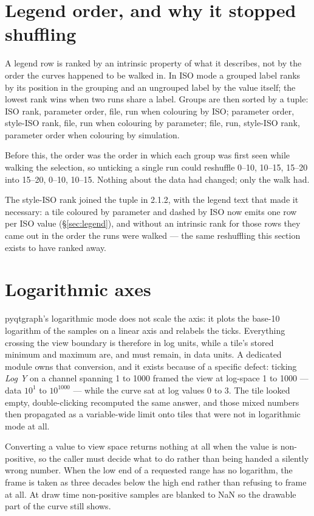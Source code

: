 \documentclass[11pt,a4paper,oneside]{report}
\newcommand{\appver}{2.1.2}
\begin{document}
\section{Legend order, and why it stopped shuffling}

A legend row is ranked by an intrinsic property of what it describes, not by the
order the curves happened to be walked in. In ISO mode a grouped label ranks by
its position in the grouping and an ungrouped label by the value itself; the
lowest rank wins when two runs share a label. Groups are then sorted by a tuple:
ISO rank, parameter order, file, run when colouring by ISO; parameter order,
style-ISO rank, file, run when colouring by parameter; file, run, style-ISO
rank, parameter order when colouring by simulation.

Before this, the order was the order in which each group was first seen while
walking the selection, so unticking a single run could reshuffle 0--10, 10--15,
15--20 into 15--20, 0--10, 10--15. Nothing about the data had changed; only the
walk had.

The style-ISO rank joined the tuple in \appver, with the legend text that made
it necessary: a tile coloured by parameter and dashed by ISO now emits one row
per ISO value (\S\ref{sec:legend}), and without an intrinsic rank for those rows
they came out in the order the runs were walked --- the same reshuffling this
section exists to have ranked away.

\section{Logarithmic axes}

pyqtgraph's logarithmic mode does not scale the axis: it plots the base-10
logarithm of the samples on a linear axis and relabels the ticks. Everything
crossing the view boundary is therefore in log units, while a tile's stored
minimum and maximum are, and must remain, in data units. A dedicated module owns
that conversion, and it exists because of a specific defect: ticking \emph{Log
Y} on a channel spanning 1 to 1000 framed the view at log-space 1 to 1000 ---
data $10^1$ to $10^{1000}$ --- while the curve sat at log values 0 to 3. The
tile looked empty, double-clicking recomputed the same answer, and those mixed
numbers then propagated as a variable-wide limit onto tiles that were not in
logarithmic mode at all.

Converting a value to view space returns nothing at all when the value is
non-positive, so the caller must decide what to do rather than being handed a
silently wrong number. When the low end of a requested range has no logarithm,
the frame is taken as three decades below the high end rather than refusing to
frame at all. At draw time non-positive samples are blanked to NaN so the
drawable part of the curve still shows.
\end{document}

